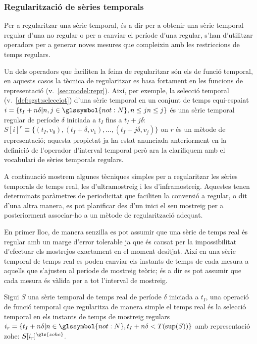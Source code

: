 \subsubsection{Regularització de sèries temporals}
\label{sec:sgst:regularitzacio}


Per a regularitzar una sèrie temporal, és a dir per a obtenir una
sèrie temporal regular d'una no regular o per a canviar el període
d'una regular, s'han d'utilitzar operadors per a generar noves mesures
que compleixin amb les restriccions de temps regulars.


Un dels operadors que faciliten la feina de regularitzar són els de
funció temporal, en aquests casos la tècnica de regularitzar es basa
fortament en les funcions de representació
(v.~\autoref{sec:model:repr}).  Així, per exemple, la selecció
temporal (v.~\autoref{def:sgst:selecciot}) d'una sèrie temporal en un
conjunt de temps equi-espaiat $i = \{t_I+n\delta |
n,j\in\glssymbol{not:N}, n\leq j n\leq j\}$ és una sèrie temporal
regular de període $\delta$ iniciada a $t_I$ fins a $t_I+j\delta$:
$S[i]^r \equiv \{ (t_I, v_0), (t_I+\delta,v_1), \dotsc ,
(t_I+j\delta,v_j)\}$ on $r$ és un mètode de representació; aquesta
propietat ja ha estat anunciada anteriorment en la definició de
l'operador d'interval temporal però ara la clarifiquem amb el
vocabulari de sèries temporals regulars. 


A continuació mostrem algunes tècniques simples per a regularitzar les
sèries temporals de temps real, les d'ultramostreig i les
d'inframostreig. Aquestes tenen determinats paràmetres de periodicitat
que faciliten la conversió a regular, o dit d'una altra manera, es pot
planificar des d'un inici el seu mostreig per a posteriorment
associar-ho a un mètode de regularització adequat.


En primer lloc, de manera senzilla es pot assumir que una sèrie de
temps real és regular amb un marge d'error tolerable ja que és causat
per la impossibilitat d'efectuar els mostrejos exactament en el moment
desitjat. Així en una sèrie temporal de temps real es poden canviar
els instants de temps de cada mesura a aquells que s'ajusten al
període de mostreig teòric; és a dir es pot assumir que cada mesura és
vàlida per a tot l'interval de mostreig. 

Sigui $S$ una sèrie temporal de temps real de període $\delta$
iniciada a $t_I$, una operació de funció temporal que regularitza de
manera simple el temps real és la selecció temporal en els instants de
temps de mostreig regulars $i_r=\{t_I+n\delta | n\in\glssymbol{not:N},
t_I+n\delta < T(\sup(S))\}$ amb representació \gls{zohe}:
$S[i_r]^{\gls{zohe}}$.

